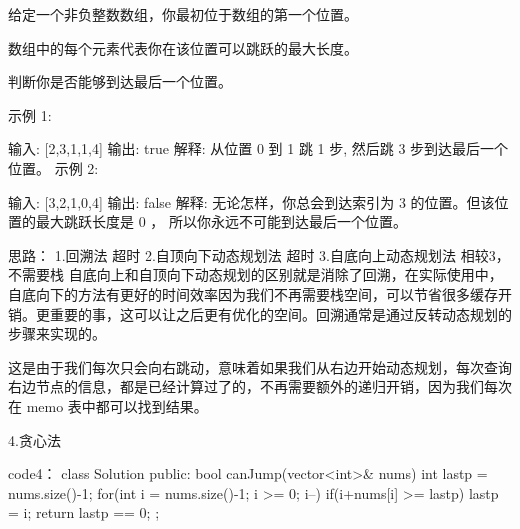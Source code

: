 给定一个非负整数数组，你最初位于数组的第一个位置。

数组中的每个元素代表你在该位置可以跳跃的最大长度。

判断你是否能够到达最后一个位置。

示例 1:

输入: [2,3,1,1,4]
输出: true
解释: 从位置 0 到 1 跳 1 步, 然后跳 3 步到达最后一个位置。
示例 2:

输入: [3,2,1,0,4]
输出: false
解释: 无论怎样，你总会到达索引为 3 的位置。但该位置的最大跳跃长度是 0 ， 所以你永远不可能到达最后一个位置。





















思路：
1.回溯法  超时
2.自顶向下动态规划法 超时
3.自底向上动态规划法 相较3，不需要栈
自底向上和自顶向下动态规划的区别就是消除了回溯，在实际使用中，自底向下的方法有更好的时间效率因为我们不再需要栈空间，可以节省很多缓存开销。更重要的事，这可以让之后更有优化的空间。回溯通常是通过反转动态规划的步骤来实现的。

这是由于我们每次只会向右跳动，意味着如果我们从右边开始动态规划，每次查询右边节点的信息，都是已经计算过了的，不再需要额外的递归开销，因为我们每次在 memo 表中都可以找到结果。


4.贪心法
































code4：
class Solution {
public:
    bool canJump(vector<int>& nums) {
        int lastp = nums.size()-1;
        for(int i = nums.size()-1; i >= 0; i--)
        {
            if(i+nums[i] >= lastp)
                lastp = i;
        }
        return lastp == 0;
    }
};